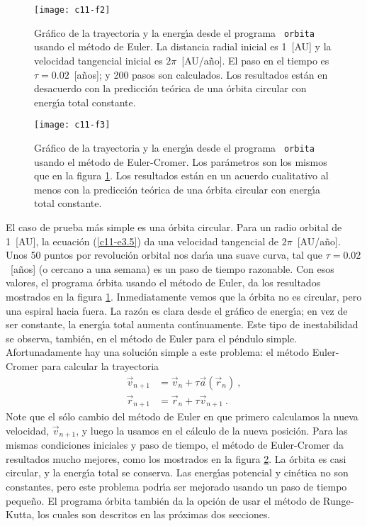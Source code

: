 \begin{figure}[h]
\begin{center}
\texttt{[image: c11-f2]}
\caption{Gr{\'a}fico de la trayectoria y la energ{\'\i}a desde el programa {\tt
    orbita} usando el m{\'e}todo de Euler. La distancia radial inicial es
  1~[AU] y la velocidad tangencial inicial es $2\pi$~[AU/a{\~n}o]. El paso
  en el tiempo es $\tau=0.02$~[a{\~n}os]; y 200 pasos son calculados. Los
  resultados est{\'a}n en desacuerdo con la predicci{\'o}n te{\'o}rica de una
  {\'o}rbita circular con energ{\'\i}a total constante.}\label{c11-f2}
\end{center}
\end{figure}
\begin{figure}[h]
\begin{center}
\texttt{[image: c11-f3]}
\caption{Gr{\'a}fico de la trayectoria y la energ{\'\i}a desde el programa {\tt
    orbita} usando el m{\'e}todo de Euler-Cromer. Los par{\'a}metros son los
  mismos que en la figura \ref{c11-f2}. Los resultados est{\'a}n en un
  acuerdo cualitativo al menos con la predicci{\'o}n te{\'o}rica de una {\'o}rbita
  circular con energ{\'\i}a total constante.}\label{c11-f3}
\end{center}
\end{figure}
El caso de prueba m{\'a}s simple es una {\'o}rbita circular. Para un radio
orbital de 1~[AU], la ecuaci{\'o}n (\ref{c11-e3.5}) da una velocidad
tangencial de $2\pi$~[AU/a{\~n}o]. Unos 50 puntos por revoluci{\'o}n orbital nos
dar{\'\i}a una suave curva, tal que $\tau=0.02$~[a{\~n}os] (o cercano a una
semana) es un paso de tiempo razonable. Con esos valores, el programa
{\'o}rbita usando el m{\'e}todo de Euler, da los resultados mostrados en la
figura \ref{c11-f2}.  Inmediatamente vemos que la {\'o}rbita no es
circular, pero una espiral hacia fuera. La raz{\'o}n es clara desde el
gr{\'a}fico de energ{\'\i}a; en vez de ser constante, la energ{\'\i}a total aumenta
cont{\'\i}nuamente. Este tipo de inestabilidad se observa, tambi{\'e}n, en el
m{\'e}todo de Euler para el p{\'e}ndulo simple.  Afortunadamente hay una
soluci{\'o}n simple a este problema: el m{\'e}todo Euler-Cromer para calcular
la trayectoria
\begin{align}
\label{c11-e3.13}
\vec v_{n+1}&=\vec v_n+\tau \vec a(\vec r_n) \ ,\\
\label{c11-e3.14}
\vec r_{n+1}&=\vec r_n+\tau \vec v_{n+1} \ .
\end{align}
Note que el s{\'o}lo cambio del m{\'e}todo de Euler en que primero calculamos
la nueva velocidad, $\vec v_{n+1}$, y luego la usamos en el c{\'a}lculo de
la nueva posici{\'o}n. Para las mismas condiciones iniciales y paso de
tiempo, el m{\'e}todo de Euler-Cromer da resultados mucho mejores, como
los mostrados en la figura \ref{c11-f3}. La {\'o}rbita es casi circular, y
la energ{\'\i}a total se conserva. Las energ{\'\i}as potencial y cin{\'e}tica no son
constantes, pero este problema podr{\'\i}a ser mejorado usando un paso de
tiempo peque{\~n}o. El programa {\'o}rbita tambi{\'e}n da la opci{\'o}n de usar el
m{\'e}todo de Runge-Kutta, los cuales son descritos en las pr{\'o}ximas dos
secciones.

